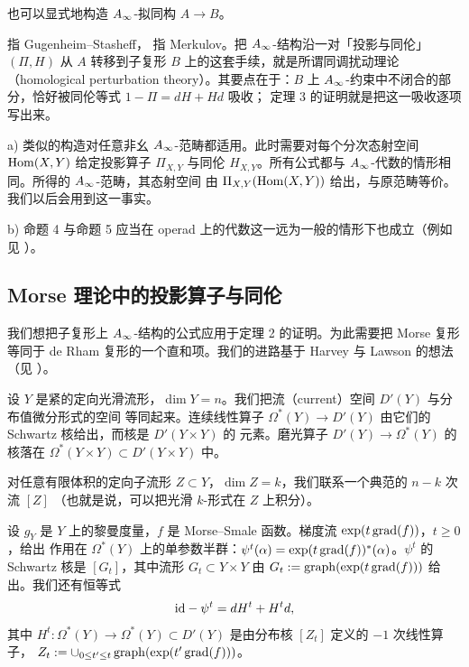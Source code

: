 也可以显式地构造 $A_{\infty}$-拟同构 $A\to B$。

\begin{yizhu}[同调扰动理论]
\cite{GS} 指 Gugenheim--Stasheff，\cite{Me} 指 Merkulov。把 $A_{\infty}$-结构沿一对「投影与同伦」
$(\Pi,H)$ 从 $A$ 转移到子复形 $B$ 上的这套手续，就是所谓同调扰动理论（homological perturbation
theory）。其要点在于：$B$ 上 $A_{\infty}$-约束中不闭合的部分，恰好被同伦等式 $1-\Pi=dH+Hd$ 吸收；
定理 3 的证明就是把这一吸收逐项写出来。
\end{yizhu}

\begin{rmk}
a) 类似的构造对任意非幺 $A_{\infty}$-范畴都适用。此时需要对每个分次态射空间 $\operatorname{Hom}(X,Y)$ 给定投影算子
$\Pi_{X,Y}$ 与同伦 $H_{X,Y}$。所有公式都与 $A_{\infty}$-代数的情形相同。所得的 $A_{\infty}$-范畴，其态射空间
由 $\Pi_{X,Y}(\operatorname{Hom}(X,Y))$ 给出，与原范畴等价。我们以后会用到这一事实。

b) 命题 4 与命题 5 应当在 operad 上的代数这一远为一般的情形下也成立（例如见 \cite{M}）。
\end{rmk}

\subsection{Morse 理论中的投影算子与同伦}

我们想把子复形上 $A_{\infty}$-结构的公式应用于定理 2 的证明。为此需要把 Morse 复形等同于 de Rham
复形的一个直和项。我们的进路基于 Harvey 与 Lawson 的想法（见 \cite{HL}）。

设 $Y$ 是紧的定向光滑流形，$\dim Y=n$。我们把流（current）空间 $D'(Y)$ 与分布值微分形式的空间
等同起来。连续线性算子 $\Omega^*(Y)\to D'(Y)$ 由它们的 Schwartz 核给出，而核是 $D'(Y\times Y)$ 的
元素。磨光算子 $D'(Y)\to\Omega^*(Y)$ 的核落在 $\Omega^*(Y\times Y)\subset D'(Y\times Y)$ 中。

对任意有限体积的定向子流形 $Z\subset Y$，$\dim Z=k$，我们联系一个典范的 $n-k$ 次流 $[Z]$
（也就是说，可以把光滑 $k$-形式在 $Z$ 上积分）。

设 $g_Y$ 是 $Y$ 上的黎曼度量，$f$ 是 Morse--Smale 函数。梯度流 $\exp(t\operatorname{grad}(f))$，$t\ge0$，给出
作用在 $\Omega^*(Y)$ 上的单参数半群：$\psi^t(\alpha)=\exp(t\operatorname{grad}(f))^*(\alpha)$。$\psi^t$ 的
Schwartz 核是 $[G_t]$，其中流形 $G_t\subset Y\times Y$ 由
$G_t:=\operatorname{graph}(\exp(t\operatorname{grad}(f)))$ 给出。我们还有恒等式
\[
  \mathrm{id}-\psi^t=dH^t+H^td,
\]
其中 $H^t:\Omega^*(Y)\to\Omega^*(Y)\subset D'(Y)$ 是由分布核 $[Z_t]$ 定义的 $-1$ 次线性算子，
$Z_t:=\cup_{0\le t'\le t}\operatorname{graph}(\exp(t'\operatorname{grad}(f)))$。

